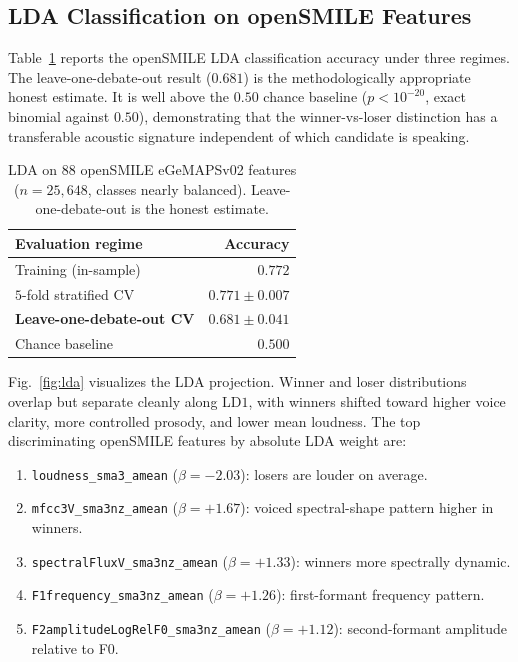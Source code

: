 \documentclass[journal]{IEEEtran}
\begin{document}
\subsection{LDA Classification on openSMILE Features}
Table~\ref{tab:lda} reports the openSMILE LDA classification accuracy
under three regimes. The leave-one-debate-out result ($0.681$) is the
methodologically appropriate honest estimate. It is well above the
$0.50$ chance baseline ($p < 10^{-20}$, exact binomial against
$0.50$), demonstrating that the winner-vs-loser distinction has a
transferable acoustic signature independent of which candidate is
speaking.

\begin{table}[t]
\caption{LDA on $88$ openSMILE eGeMAPSv02 features
($n = 25{,}648$, classes nearly balanced). Leave-one-debate-out is
the honest estimate.}
\label{tab:lda}
\centering
\begin{tabular}{lr}
\toprule
Evaluation regime                         & Accuracy \\
\midrule
Training (in-sample)                      & $0.772$ \\
$5$-fold stratified CV                    & $0.771 \pm 0.007$ \\
\textbf{Leave-one-debate-out CV}          & $\mathbf{0.681 \pm 0.041}$ \\
Chance baseline                           & $0.500$ \\
\bottomrule
\end{tabular}
\end{table}

Fig.~\ref{fig:lda} visualizes the LDA projection. Winner and loser
distributions overlap but separate cleanly along LD$1$, with winners
shifted toward higher voice clarity, more controlled prosody, and
lower mean loudness. The top discriminating openSMILE features by
absolute LDA weight are:

\begin{enumerate}
  \item \texttt{loudness\_sma3\_amean} ($\beta = -2.03$): losers
        are louder on average.
  \item \texttt{mfcc3V\_sma3nz\_amean} ($\beta = +1.67$): voiced
        spectral-shape pattern higher in winners.
  \item \texttt{spectralFluxV\_sma3nz\_amean} ($\beta = +1.33$):
        winners more spectrally dynamic.
  \item \texttt{F1frequency\_sma3nz\_amean} ($\beta = +1.26$):
        first-formant frequency pattern.
  \item \texttt{F2amplitudeLogRelF0\_sma3nz\_amean} ($\beta = +1.12$):
        second-formant amplitude relative to F0.
\end{enumerate}
\end{document}
